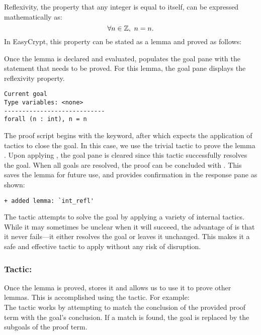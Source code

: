 Reflexivity, the property that any integer is equal to itself, can be expressed mathematically as: \[
\forall n\in\mathbb{Z},\ n=n.
\] In EasyCrypt, this property can be stated as a lemma and proved as follows:\\

Once the lemma is declared and evaluated, \EasyCrypt populates the goal pane with the statement that needs to be proved. For this lemma, the goal pane displays the reflexivity property.\\
\begin{lstlisting}[style=normal]
Current goal
Type variables: <none>
----------------------------
forall (n : int), n = n
\end{lstlisting}

The proof script begins with the  keyword, after which \EasyCrypt expects the application of tactics to close the goal. In this case, we use the trivial tactic to prove the lemma . Upon applying , the goal pane is cleared since this tactic successfully resolves the goal. When all goals are resolved, the proof can be concluded with . This saves the lemma for future use, and \EasyCrypt provides confirmation in the response pane as shown:\\
\begin{lstlisting}[style=normal]
+ added lemma: `int_refl'
\end{lstlisting}
The  tactic attempts to solve the goal by applying a variety of internal tactics. While it may sometimes be unclear when it will succeed, the advantage of  is that it never fails—it either resolves the goal or leaves it unchanged. This makes it a safe and effective tactic to apply without any risk of disruption.

\newpage
\subsubsection{Tactic: }
Once the lemma  is proved, \EasyCrypt stores it and allows us to use it to prove other lemmas. This is accomplished using the  tactic. For example:\\
The  tactic works by attempting to match the conclusion of the provided proof term with the goal’s conclusion. If a match is found, the goal is replaced by the subgoals of the proof term.

